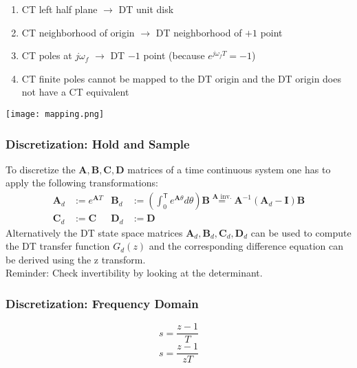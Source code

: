 \begin{enumerate}
    \item CT left half plane $\rightarrow$ DT unit disk
    \item CT neighborhood of origin $\rightarrow$ DT neighborhood of $+1$ point
    \item CT poles at $j\omega_f$ $\rightarrow$ DT $-1$ point (because $e^{j\omega_{f}T}=-1$)
    \item CT finite poles cannot be mapped to the DT origin and the DT origin does not have a CT equivalent
\end{enumerate}

\begin{center}
    \texttt{[image: mapping.png]}
\end{center}


\subsubsection{Discretization: Hold and Sample}\label{disc::hold_and_sample}

To discretize the $\mathbf{A}, \mathbf{B}, \mathbf{C}, \mathbf{D}$ matrices of a time continuous system one has to apply the following transformations:
\begin{align*}
    \mathbf{A}_d & :=e^{\mathbf{A}T} & \mathbf{B}_d & :=\left(\int_0^{\mathsf{T}} {e^{\mathbf{A}\theta}}d\theta\right)\mathbf{B} \overset{\mathbf{A} \text{ inv.}}{=} \mathbf{A}^{-1}\left(\mathbf{A}_d-\mathbf{I}\right)\mathbf{B} \\
    \mathbf{C}_d & :=\mathbf{C}      & \mathbf{D}_d & :=\mathbf{D}
\end{align*}
Alternatively the DT state space matrices $\mathbf{A}_d, \mathbf{B}_d, \mathbf{C}_d, \mathbf{D}_d$ can be used to compute the DT transfer function $G_{d}(z)$ and the corresponding difference equation can be derived using the z transform.\\
Reminder: Check invertibility by looking at the determinant.

\subsubsection{Discretization: Frequency Domain}\label{disc::tustin}
\noindent\begin{equation*}
    s = \frac{z-1}{T}
\end{equation*}
\noindent\begin{equation*}
    s = \frac{z-1}{zT}
\end{equation*}

